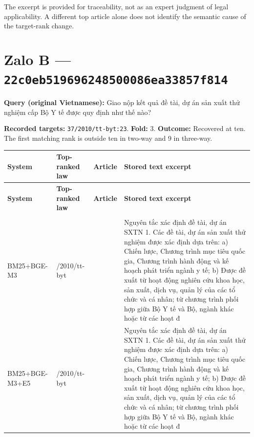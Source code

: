 The excerpt is provided for traceability, not as an expert judgment of legal applicability. A different top article alone does not identify the semantic cause of the target-rank change.

\section{Zalo B — \texttt{22c0eb51\allowbreak{}96962485\allowbreak{}00086ea3\allowbreak{}3857f814}}

\textbf{Query (original Vietnamese):} Giao nộp kết quả đề tài, dự án sản xuất thử nghiệm cấp Bộ Y tế được quy định như thế nào?

\textbf{Recorded targets:} \texttt{37/2010/\allowbreak{}tt-byt:2\allowbreak{}3}. \textbf{Fold:} 3. \textbf{Outcome:} Recovered at ten. The first matching rank is outside ten in two-way and 9 in three-way.

\begingroup
\scriptsize
\setlength{\tabcolsep}{2pt}
\renewcommand{\arraystretch}{1.0}
\begin{longtable}{>{\raggedright\arraybackslash}p{2.022cm}>{\raggedright\arraybackslash}p{2.022cm}>{\raggedright\arraybackslash}p{1.891cm}>{\raggedright\arraybackslash}p{9.185cm}}
\toprule
\textbf{System} & \textbf{Top-ranked law} & \textbf{Article} & \textbf{Stored text excerpt} \\
\midrule
\endfirsthead
\toprule
\textbf{System} & \textbf{Top-ranked law} & \textbf{Article} & \textbf{Stored text excerpt} \\
\midrule
\endhead
\midrule
\multicolumn{4}{r}{\footnotesize Continued on next page}\\
\endfoot
\bottomrule
\endlastfoot
BM25+\allowbreak{}BGE-M3 & 37/\allowbreak{}2010/\allowbreak{}tt-byt & 3 & Nguyên tắc xác định đề tài, dự án SXTN     1. Các đề tài, dự án sản xuất thử nghiệm được xác định dựa trên:     a) Chiến lược, Chương trình mục tiêu quốc gia, Chương trình hành động và kế hoạch phát triển ngành y tế;     b) Được đề xuất từ hoạt động nghiên cứu khoa học, sản xuất, dịch vụ, quản lý của các tổ chức và cá nhân; từ chương trình phối hợp giữa Bộ Y tế và Bộ, ngành khác hoặc từ các hoạt đ \\
BM25+\allowbreak{}BGE-M3+\allowbreak{}E5 & 37/\allowbreak{}2010/\allowbreak{}tt-byt & 3 & Nguyên tắc xác định đề tài, dự án SXTN     1. Các đề tài, dự án sản xuất thử nghiệm được xác định dựa trên:     a) Chiến lược, Chương trình mục tiêu quốc gia, Chương trình hành động và kế hoạch phát triển ngành y tế;     b) Được đề xuất từ hoạt động nghiên cứu khoa học, sản xuất, dịch vụ, quản lý của các tổ chức và cá nhân; từ chương trình phối hợp giữa Bộ Y tế và Bộ, ngành khác hoặc từ các hoạt đ \\
\end{longtable}
\endgroup

